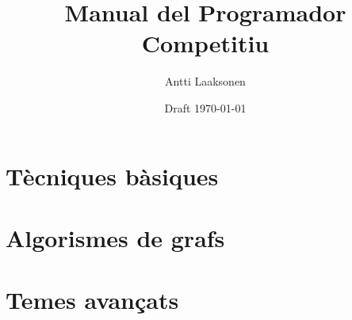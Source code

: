 \documentclass[twoside,12pt,a4paper,catalan]{book}
\date{Draft \today}
\title{\Huge Manual del Programador Competitiu}
\author{\Large Antti Laaksonen}
\begin{document}


\frontmatter
\maketitle
\setcounter{tocdepth}{1}
\tableofcontents



\mainmatter
{}
\setcounter{page}{1}

\newcommand{\key}[1] {\textbf{#1}}

\part{Tècniques bàsiques}










\part{Algorismes de grafs}










\part{Temes avançats}


%
%
%
%
%
%
%
%

\cleardoublepage
{}
{}


\cleardoublepage
\printindex
\end{document}
